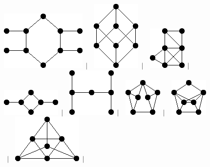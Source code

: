 \documentclass[11pt,paper=b5,footinclude,headinclude]{scrbook} %
\newtheorem{ex}{Vaja\hypertarget{sol:\theex}}[chapter]
\begin{document}
\begin{ex}
\begin{figure}
\includegraphics[scale=0.5]{smallGraphs/g_X75.png}$\,\mid\,$\
\includegraphics[scale=0.5]{smallGraphs/g_X79.png}$\,\mid\,$\
\includegraphics[scale=0.5]{smallGraphs/g_X82.png}$\,\mid\,$\
\includegraphics[scale=0.5]{smallGraphs/g_X84.png}$\,\mid\,$\
\includegraphics[scale=0.5]{smallGraphs/g_X85.png}$\,\mid\,$\
\includegraphics[scale=0.5]{smallGraphs/g_X86.png}$\,\mid\,$\
\includegraphics[scale=0.5]{smallGraphs/g_X87.png}$\,\mid\,$\
\includegraphics[scale=0.5]{smallGraphs/g_X88.png}$\,\mid\,$\

\end{figure}
\end{ex}
\end{document}

